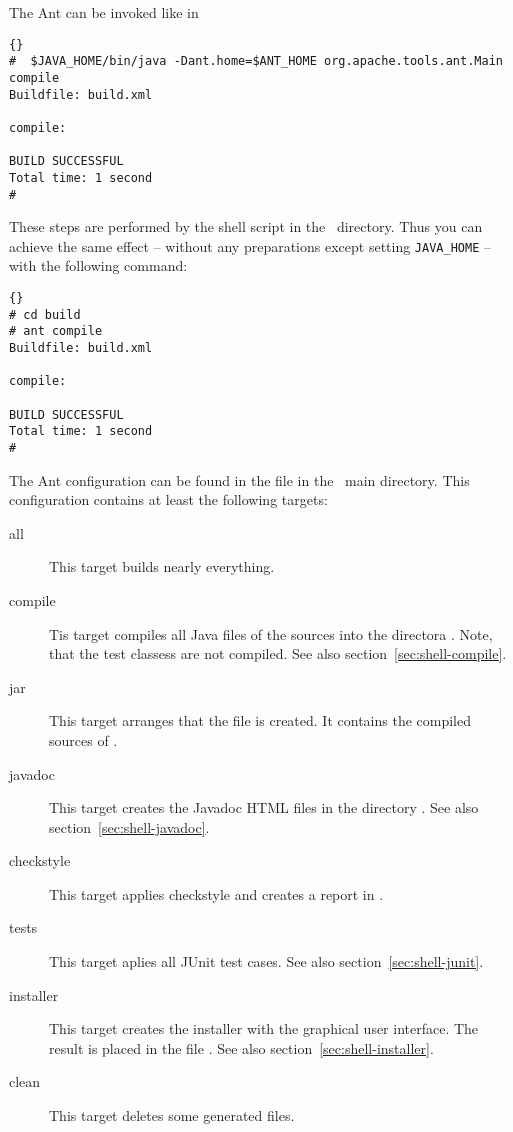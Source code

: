 The Ant can be invoked like in

\begin{lstlisting}{}
#  $JAVA_HOME/bin/java -Dant.home=$ANT_HOME org.apache.tools.ant.Main compile
Buildfile: build.xml

compile:

BUILD SUCCESSFUL
Total time: 1 second
#
\end{lstlisting}

These steps are performed by the shell script  in the
\ExTeX\ directory. Thus you can achieve the same effect -- without any
preparations except setting \verb|JAVA_HOME| -- with the following command:

\begin{lstlisting}{}
# cd build
# ant compile
Buildfile: build.xml

compile:

BUILD SUCCESSFUL
Total time: 1 second
#
\end{lstlisting}

The Ant configuration can be found in the file  in the
\ExTeX\ main directory. This configuration contains at least the
following targets:

\begin{description}
\item [all] This target builds nearly everything.
\item [compile] Tis target compiles all Java files of the sources into
  the directora . Note, that the test classess
  are not compiled. See also section~\ref{sec:shell-compile}.
\item [jar] This target arranges that the file 
  is created. It contains the compiled sources of  \ExTeX.
\item [javadoc] This target creates the Javadoc HTML files in the
  directory . See also section~\ref{sec:shell-javadoc}.
\item [checkstyle] This target applies checkstyle and creates a report
  in .
\item [tests] This target aplies all JUnit test cases. See also
  section~\ref{sec:shell-junit}.
\item [installer] This target creates the installer with the graphical
  user interface. The result is placed in the file
  . See also section~\ref{sec:shell-installer}.
\item [clean] This target deletes some generated files.
\end{description}


